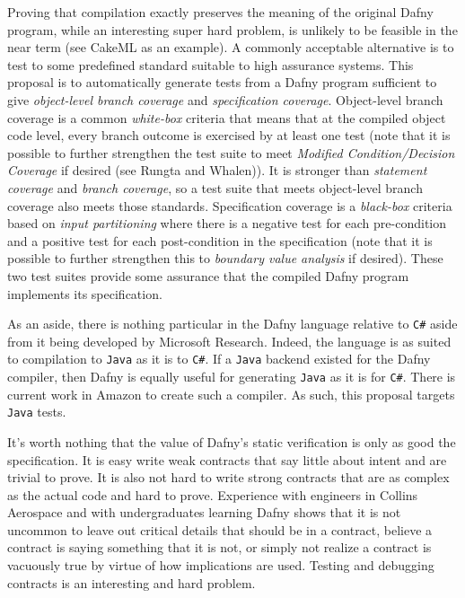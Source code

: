 \documentclass[11pt,onecolumn,notitlepage]{article}
\begin{document}
Proving that compilation exactly preserves the meaning of the original Dafny program, while an interesting super hard problem, is unlikely to be feasible in the near term (see CakeML as an example). A commonly acceptable alternative is to test to some predefined standard suitable to high assurance systems. This proposal is to automatically generate tests from a Dafny program sufficient to give \emph{object-level branch coverage} and \emph{specification coverage}. Object-level branch coverage is a common \emph{white-box} criteria that means that at the compiled object code level, every branch outcome is exercised by at least one test (note that it is possible to further strengthen the test suite to meet \emph{Modified Condition/Decision Coverage} if desired (see Rungta and Whalen)). It is stronger than \emph{statement coverage} and \emph{branch coverage}, so a test suite that meets object-level branch coverage also meets those standards. Specification coverage is a \emph{black-box} criteria based on \emph{input partitioning} where there is a negative test for each pre-condition and a positive test for each post-condition in the specification (note that it is possible to further strengthen this to \emph{boundary value analysis} if desired). These two test suites provide some assurance that the compiled Dafny program implements its specification.

As an aside, there is nothing particular in the Dafny language relative to \texttt{C\#} aside from it being developed by Microsoft Research. Indeed, the language is as suited to compilation to \texttt{Java} as it is to \texttt{C\#}. If a \texttt{Java} backend existed for the Dafny compiler, then Dafny is equally useful for generating \texttt{Java} as it is for \texttt{C\#}. There is current work in Amazon to create such a compiler. As such, this proposal targets \texttt{Java} tests.

It's worth nothing that the value of Dafny's static verification is only as good the specification. It is easy write weak contracts that say little about intent and are trivial to prove. It is also not hard to write strong contracts that are as complex as the actual code and hard to prove. Experience with engineers in Collins Aerospace and with undergraduates learning Dafny shows that it is not uncommon to leave out critical details that should be in a contract, believe a contract is saying something that it is not, or simply not realize a contract is vacuously true by virtue of how implications are used. Testing and debugging contracts is an interesting and hard problem. 
\end{document}
